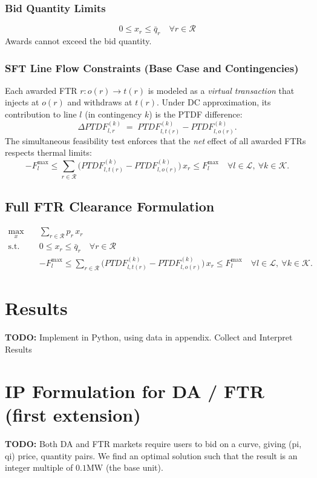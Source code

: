 \documentclass[11pt]{article}
\begin{document}
\subsubsection{Bid Quantity Limits}
\begin{equation}
0 \le x_r \le \bar q_r \quad \forall r\in\mathcal{R}
\tag{2}
\end{equation}
Awards cannot exceed the bid quantity.

\subsubsection{SFT Line Flow Constraints (Base Case and Contingencies)}
Each awarded FTR $r: o(r)\to t(r)$ is modeled as a \emph{virtual transaction} that injects at $o(r)$ and
withdraws at $t(r)$. Under DC approximation, its contribution to line $l$ (in contingency $k$) is the PTDF
difference:
\[
\Delta PTDF^{(k)}_{l,r} \;=\; PTDF^{(k)}_{l,t(r)} - PTDF^{(k)}_{l,o(r)}.
\]
The simultaneous feasibility test enforces that the \emph{net} effect of all awarded FTRs respects thermal limits:
\begin{equation}
- F_l^{\max}
\le
\sum_{r\in\mathcal{R}} \Big( PTDF^{(k)}_{l,t(r)} - PTDF^{(k)}_{l,o(r)} \Big)\,x_r
\le
F_l^{\max}
\quad \forall l\in\mathcal{L},\ \forall k\in\mathcal{K}.
\tag{3}
\end{equation}

\subsection{Full FTR Clearance Formulation}
\begin{align}
\max_{x}\quad & \sum_{r\in\mathcal{R}} p_r\,x_r
\tag{4}\\[4pt]
\text{s.t.}\quad
& 0 \le x_r \le \bar q_r \quad \forall r\in\mathcal{R}
\tag{5}\\[4pt]
& - F_l^{\max}
\le
\sum_{r\in\mathcal{R}} \Big( PTDF^{(k)}_{l,t(r)} - PTDF^{(k)}_{l,o(r)} \Big)\,x_r
\le
F_l^{\max}
\quad \forall l\in\mathcal{L},\ \forall k\in\mathcal{K}.
\tag{6}
\end{align}

\section{Results}
\textbf{TODO:} Implement in Python, using data in appendix. Collect and Interpret Results

\section{IP Formulation for DA / FTR (first extension)}
\textbf{TODO:} Both DA and FTR markets require users to bid on a curve, giving (pi, qi) price, quantity pairs. We find an optimal solution such that the result is an integer multiple of $0.1\text{MW}$ (the base unit).
\end{document}
